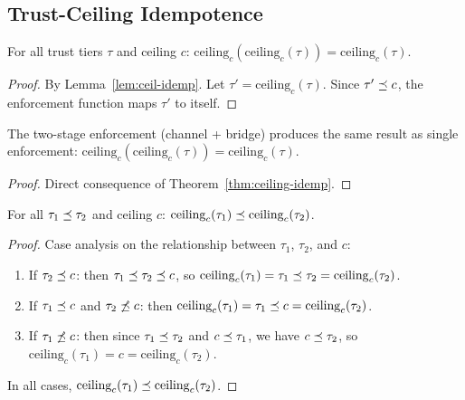 \documentclass[11pt]{article}
\newcommand{\TrustCeil}{\mathrm{ceiling}}
\begin{document}
\subsection{Trust-Ceiling Idempotence}
\label{sec:formal:ceiling}

\begin{theorem}
\label{thm:ceiling-idemp}
For all trust tiers $\tau$ and ceiling $c$:
$\TrustCeil_c(\TrustCeil_c(\tau)) = \TrustCeil_c(\tau)$.
\end{theorem}

\begin{proof}
By Lemma~\ref{lem:ceil-idemp}.  Let $\tau' = \TrustCeil_c(\tau)$.
Since $\tau' \preceq c$, the enforcement function maps $\tau'$ to
itself.
\end{proof}

\begin{corollary}
\label{cor:double-enforce}
The two-stage enforcement (channel + bridge) produces the same
result as single enforcement:
$\TrustCeil_c(\TrustCeil_c(\tau)) = \TrustCeil_c(\tau)$.
\end{corollary}

\begin{proof}
Direct consequence of Theorem~\ref{thm:ceiling-idemp}.
\end{proof}

\begin{theorem}
\label{thm:ceil-mono}
For all $\tau_1 \preceq \tau_2$ and ceiling $c$:
$\TrustCeil_c(\tau_1) \tleq \TrustCeil_c(\tau_2)$.
\end{theorem}

\begin{proof}
Case analysis on the relationship between $\tau_1$, $\tau_2$, and $c$:
\begin{enumerate}
\item If $\tau_2 \preceq c$: then $\tau_1 \preceq \tau_2 \preceq c$, so
  $\TrustCeil_c(\tau_1) = \tau_1 \tleq \tau_2 = \TrustCeil_c(\tau_2)$.
\item If $\tau_1 \preceq c$ and $\tau_2 \not\preceq c$: then
  $\TrustCeil_c(\tau_1) = \tau_1 \tleq c = \TrustCeil_c(\tau_2)$.
\item If $\tau_1 \not\preceq c$: then since $\tau_1 \preceq \tau_2$
  and $c \preceq \tau_1$, we have $c \preceq \tau_2$, so
  $\TrustCeil_c(\tau_1) = c = \TrustCeil_c(\tau_2)$.
\end{enumerate}
In all cases, $\TrustCeil_c(\tau_1) \tleq \TrustCeil_c(\tau_2)$.
\end{proof}
\end{document}
